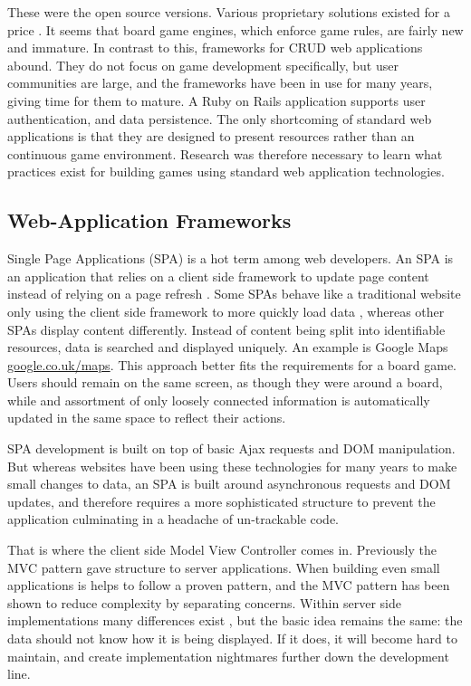 These were the open source versions. Various proprietary solutions existed for a price \cite{PhotonEngine, Cocos2DX, LearnCocos2D}. It seems that board game engines, which enforce game rules, are fairly new and immature. In contrast to this, frameworks for CRUD web applications abound. They do not focus on game development specifically, but user communities are large, and the frameworks have been in use for many years, giving time for them to mature. A Ruby on Rails \cite{Rails} application supports user authentication, and data persistence. The only shortcoming of standard web applications is that they are designed to present resources rather than an continuous game environment. Research was therefore necessary to learn what practices exist for building games using standard web application technologies.

\subsection{Web-Application Frameworks}
Single Page Applications (SPA) is a hot term among web developers. An SPA is an application that relies on a client side framework to update page content instead of relying on a page refresh \cite{SPABook}. Some SPAs behave like a traditional website only using the client side framework to more quickly load data \cite{DevBBoneApps}, whereas other SPAs display content differently. Instead of content being split into identifiable resources, data is searched and displayed uniquely. An example is Google Maps \url{google.co.uk/maps}. This approach better fits the requirements for a board game. Users should remain on the same screen, as though they were around a board, while and assortment of only loosely connected information is automatically updated in the same space to reflect their actions.
	
SPA development is built on top of basic Ajax requests and DOM manipulation. But whereas websites have been using these technologies for many years to make small changes to data, an SPA is built around asynchronous requests and DOM updates, and therefore requires a more sophisticated structure to prevent the application culminating in a headache of un-trackable code.
	
That is where the client side Model View Controller comes in. Previously the MVC pattern gave structure to server applications. When building even small applications is helps to follow a proven pattern, and the MVC pattern has been shown to reduce complexity by separating concerns. Within server side implementations many differences exist \cite{CompareFrWrks}, but the basic idea remains the same: the data should not know how it is being displayed. If it does, it will become hard to maintain, and create implementation nightmares further down the development line.
	
